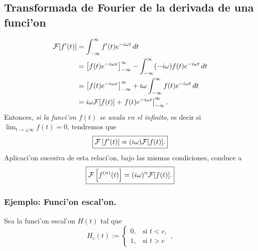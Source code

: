 \subsection{Transformada de Fourier de la derivada de una funci'on}
\begin{align}
{\cal F}[f'(t)]
 &=\int_{-\infty}^\infty f'(t) e^{-i\omega t}\,dt \\
 &=\left[ f(t) e^{-i\omega x}\right]_{-\infty}^\infty
 -\int_{-\infty}^\infty (-i\omega) f(t) e^{-i\omega t}\,dt \\
 &=\left[ f(t) e^{-i\omega x}\right]_{-\infty}^\infty+ i\omega\int_{-\infty}^\infty f(t) e^{-i\omega t}\,dt \\
 &= i\omega{\cal F}[f(t)]+\left. f(t) e^{-i\omega t}\right|_{-\infty}^\infty.\label{eq:trans-fourier-derivada-gen}
\end{align}
Entonces, \textit{si la funci'on $f(t)$ se anula en el infinito}, es decir si $\lim_{t\to\pm\infty}f(t)=0$, tendremos que
\begin{equation}
\boxed{ 
{\cal F}\left[f'(t)\right] = (i\omega){\cal F}[f(t)]. \label{eq:trans-fourier-derivada-esp}
 } 
\end{equation} 
Aplicaci'on sucesiva de esta relaci'on, bajo las mismas condiciones, conduce a
\begin{equation}
\boxed{ 
{\cal F}\left[f^{(n)}(t)\right] = (i\omega)^n{\cal F}[f(t)]. 
 } 
\end{equation} 



\subsubsection{Ejemplo: Funci'on escal'on.}
Sea la funci'on escal'on $H(t)$ tal que
\begin{equation}
H_c(t) := 
\begin{cases}
0, &\text{si }t < c,\\
1, &\text{si }t > c
\end{cases},
\end{equation}

